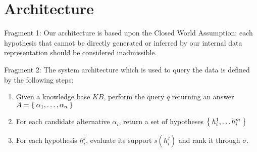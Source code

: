 \section{Architecture}
{\color{red} Fragment 1:} Our architecture is based upon the Closed World Assumption: each hypothesis that cannot be directly generated or inferred by our internal data representation should be considered inadmissible. 

{\color{red} Fragment 2:} The system architecture which is used to query the data is defined by the following steps:
\begin{enumerate}
	\item Given a knowledge base $KB$, perform the query $q$ returning an answer $A=\Set{\alpha_1,\dots,\alpha_n}$
	\item For each candidate alternative $\alpha_i$, return a set of hypotheses $\Set{h^1_i,\dots h^m_i}$
	\item For each hypothesis $h^j_i$, evaluate its support $s(h^j_i)$ and rank it through $\sigma$.
\end{enumerate}

